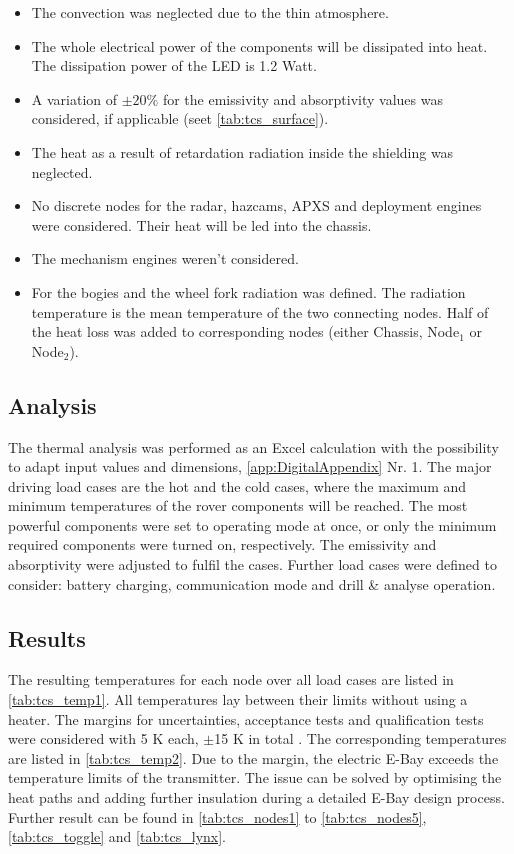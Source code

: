 \begin{itemize}
	\item The convection was neglected due to the thin atmosphere.
	\item The whole electrical power of the components will be dissipated into heat. The dissipation power of the LED is 1.2 Watt.
	\item A variation of $\pm 20\%$ for the emissivity and absorptivity values was considered, if applicable (seet \autoref{tab:tcs_surface}). 
	\item The heat as a result of retardation radiation inside the shielding was neglected.
	\item No discrete nodes for the radar, hazcams, APXS and deployment engines were considered. Their heat will be led into the chassis.
	\item The mechanism engines weren't considered.
	\item For the bogies  and the wheel fork radiation was defined. The radiation temperature is the mean temperature of the two connecting nodes. Half of the heat loss was added to corresponding nodes (either Chassis, Node$_1$ or Node$_2$).
\end{itemize}


\subsection{Analysis}
The thermal analysis was performed as an Excel calculation with the  possibility to adapt input values and dimensions, \autoref{app:DigitalAppendix} Nr. 1.
The major driving load cases are the  hot and the cold cases, where the maximum and minimum temperatures of the rover components will be reached.
The most powerful components were set to operating mode at once, or only the minimum required components were turned on, respectively.
The emissivity and absorptivity were adjusted to fulfil the cases.
Further load cases were defined to consider: battery charging, communication mode and  drill \& analyse operation.

\subsection{Results}
The resulting temperatures for each node over all load cases  are listed in \autoref{tab:tcs_temp1}.
All temperatures lay between their limits without using a heater.
The margins for uncertainties, acceptance tests and qualification tests were considered with 5 K each, $\pm$15 K in total \cite{ref_tcs_05}.
The corresponding temperatures are listed in \autoref{tab:tcs_temp2}.
Due to the margin, the electric E-Bay exceeds the temperature limits of the transmitter.
The issue can be solved by optimising the heat paths and adding further insulation during a detailed E-Bay design process.
Further result can be found in \autoref{tab:tcs_nodes1} to \autoref{tab:tcs_nodes5}, \autoref{tab:tcs_toggle} and  \autoref{tab:tcs_lynx}.

